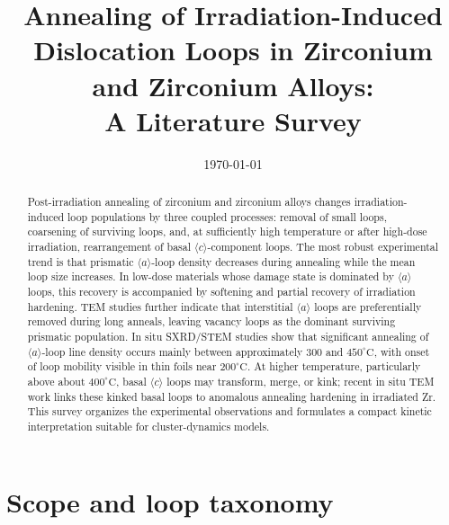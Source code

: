 \documentclass[11pt]{article}
\title{Annealing of Irradiation-Induced Dislocation Loops in Zirconium and Zirconium Alloys:\\A Literature Survey}
\author{}
\date{\today}
\newcommand{\degreeC}{^\circ\mathrm{C}}
\begin{document}
\maketitle

\begin{abstract}
Post-irradiation annealing of zirconium and zirconium alloys changes irradiation-induced loop populations by three coupled processes: removal of small loops, coarsening of surviving loops, and, at sufficiently high temperature or after high-dose irradiation, rearrangement of basal $\langle c\rangle$-component loops.  The most robust experimental trend is that prismatic $\langle a\rangle$-loop density decreases during annealing while the mean loop size increases.  In low-dose materials whose damage state is dominated by $\langle a\rangle$ loops, this recovery is accompanied by softening and partial recovery of irradiation hardening.  TEM studies further indicate that interstitial $\langle a\rangle$ loops are preferentially removed during long anneals, leaving vacancy loops as the dominant surviving prismatic population.  In situ SXRD/STEM studies show that significant annealing of $\langle a\rangle$-loop line density occurs mainly between approximately $300$ and $450\degreeC$, with onset of loop mobility visible in thin foils near $200\degreeC$.  At higher temperature, particularly above about $400\degreeC$, basal $\langle c\rangle$ loops may transform, merge, or kink; recent in situ TEM work links these kinked basal loops to anomalous annealing hardening in irradiated Zr.  This survey organizes the experimental observations and formulates a compact kinetic interpretation suitable for cluster-dynamics models.
\end{abstract}

\section{Scope and loop taxonomy}
\end{document}
